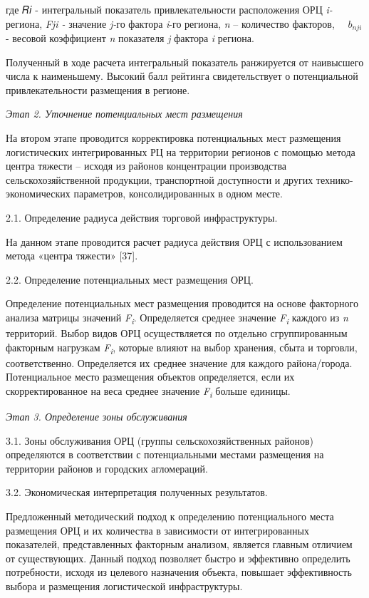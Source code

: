 \begin{multicols}{2}
где 𝑅𝑖 - интегральный показатель привлекательности расположения ОРЦ
\emph{i-} региона, \emph{Fji -} значение \emph{j-}го фактора \emph{i}-го
региона, \emph{n} -- количество факторов,\({\ \ \ \ \ \ b}_{nji\ }\)-
весовой коэффициент \emph{n} показателя \emph{j} фактора \emph{i}
региона.

Полученный в ходе расчета интегральный показатель ранжируется от
наивысшего числа к наименьшему. Высокий балл рейтинга свидетельствует о
потенциальной привлекательности размещения в регионе.

\emph{Этап 2. Уточнение потенциальных мест размещения}

На втором этапе проводится корректировка потенциальных мест размещения
логистических интегрированных РЦ на территории регионов с помощью метода
центра тяжести -- исходя из районов концентрации производства
сельскохозяйственной продукции, транспортной доступности и других
технико-экономических параметров, консолидированных в одном месте.

2.1. Определение радиуса действия торговой инфраструктуры.

На данном этапе проводится расчет радиуса действия ОРЦ с использованием
метода «центра тяжести» {[}37{]}.

2.2. Определение потенциальных мест размещения ОРЦ.

Определение потенциальных мест размещения проводится на основе
факторного анализа матрицы значений \emph{F\textsubscript{i}}.
Определяется среднее значение \emph{F\textsubscript{i}} каждого из
\emph{n} территорий. Выбор видов ОРЦ осуществляется по отдельно
сгруппированным факторным нагрузкам \emph{F\textsubscript{i}}, которые
влияют на выбор хранения, сбыта и торговли, соответственно. Определяется
их среднее значение для каждого района/города. Потенциальное место
размещения объектов определяется, если их скорректированное на веса
среднее значение \emph{F\textsubscript{i}} больше единицы.

\emph{Этап 3. Определение зоны обслуживания}

3.1. Зоны обслуживания ОРЦ (группы сельскохозяйственных районов)
определяются в соответствии с потенциальными местами размещения на
территории районов и городских агломераций.

3.2. Экономическая интерпретация полученных результатов.

Предложенный методический подход к определению потенциального места
размещения ОРЦ и их количества в зависимости от интегрированных
показателей, представленных факторным анализом, является главным
отличием от существующих. Данный подход позволяет быстро и эффективно
определить потребности, исходя из целевого назначения объекта, повышает
эффективность выбора и размещения логистической инфраструктуры.


\end{multicols}

